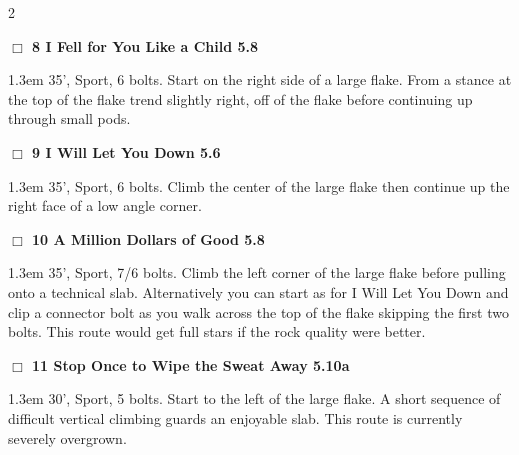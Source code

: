 \begin{multicols}{2}
\colorbox{green!20}{
\parbox{0.95\linewidth}{
\hspace{-1ex}\textbf{$\Box$
8 I Fell for You Like a Child 5.8  
}}}
\begin{adjustwidth}{1.3em}{}			
35', Sport, 6 bolts. Start on the right side of a large flake. From a stance at the top of the flake trend slightly right, off of the flake before continuing up through small pods.
\end{adjustwidth}
\needspace{2em}
\label{rt:I Will Let You Down}
\colorbox{green!20}{
\parbox{0.95\linewidth}{
\hspace{-1ex}\textbf{$\Box$
9 I Will Let You Down 5.6  
}}}
\begin{adjustwidth}{1.3em}{}			
35', Sport, 6 bolts. Climb the center of the large flake then continue up the right face of a low angle corner.
\end{adjustwidth}
\needspace{2em}
\label{rt:A Million Dollars of Good}
\colorbox{green!20}{
\parbox{0.95\linewidth}{
\hspace{-1ex}\textbf{$\Box$
10 A Million Dollars of Good 5.8  
}}}
\begin{adjustwidth}{1.3em}{}			
35', Sport, 7/6 bolts. Climb the left corner of the large flake before pulling onto a technical slab. Alternatively you can start as for I Will Let You Down and clip a connector bolt as you walk across the top of the flake skipping the first two bolts. This route would get full stars if the rock quality were better.
\end{adjustwidth}
\needspace{2em}
\label{rt:Stop Once to Wipe the Sweat Away}
\colorbox{RoyalBlue!20}{
\parbox{0.95\linewidth}{
\hspace{-1ex}\textbf{$\Box$
11 Stop Once to Wipe the Sweat Away 5.10a  
}}}
\begin{adjustwidth}{1.3em}{}			
30', Sport, 5 bolts. Start to the left of the large flake. A short sequence of difficult vertical climbing guards an enjoyable slab. This route is currently severely overgrown.
\end{adjustwidth}
	\end{multicols}
\clearpage